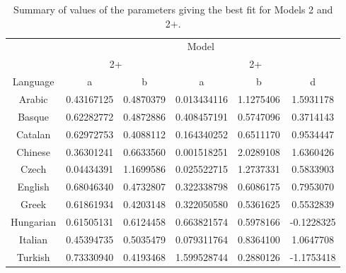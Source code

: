 \documentclass{article}
\begin{document}
\begin{table}[H]
\centering
\begin{tabular}{c|cc|ccc|}
    \cline{2-6}
    & \multicolumn{5}{c|}{Model} \\
    \cline{2-6}
    & \multicolumn{2}{c|}{2+} & \multicolumn{3}{c|}{2+} \\
    \hline
    \multicolumn{1}{|c|}{Language}  & a & b & a & b & d\\
    \hline
    \multicolumn{1}{|c|}{Arabic}    & 0.43167125   & 0.4870379    & 0.013434116   & 1.1275406      & 1.5931178    \\
    \multicolumn{1}{|c|}{Basque}    & 0.62282772   & 0.4872886 & 0.408457191   & 0.5747096      & 0.3714143    \\
    \multicolumn{1}{|c|}{Catalan}   & 0.62972753   & 0.4088112    & 0.164340252 & 0.6511170      &  0.9534447   \\
    \multicolumn{1}{|c|}{Chinese}   & 0.36301241   & 0.6633560    & 0.001518251   & 2.0289108      & 1.6360426    \\
    \multicolumn{1}{|c|}{Czech}     & 0.04434391   & 1.1699586    & 0.025522715   & 1.2737331      &  0.5833903   \\
    \multicolumn{1}{|c|}{English}   & 0.68046340   & 0.4732807    & 0.322338798   & 0.6086175      & 0.7953070    \\
    \multicolumn{1}{|c|}{Greek}     & 0.61861934   & 0.4203148    &  0.322050580  & 0.5361625 &  0.5532839   \\
    \multicolumn{1}{|c|}{Hungarian} & 0.61505131   & 0.6124458    & 0.663821574   & 0.5978166     &  -0.1228325   \\
    \multicolumn{1}{|c|}{Italian}   & 0.45394735   & 0.5035479    & 0.079311764   & 0.8364100      & 1.0647708    \\
    \multicolumn{1}{|c|}{Turkish}   & 0.73330940 & 0.4193468    & 1.599528744   & 0.2880126     &  -1.1753418   \\
    \hline
\end{tabular}
\label{Table:T6}
\caption{Summary of values of the parameters giving the best fit for Models 2 and 2+.}
\end{table}
\end{document}
